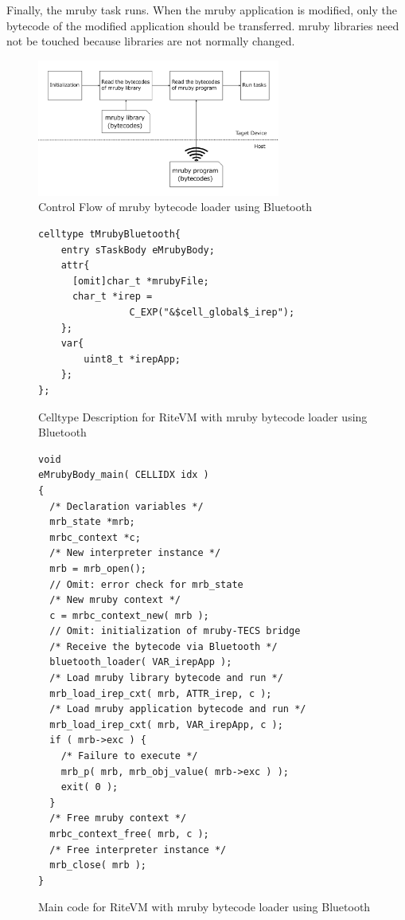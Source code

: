\documentclass[conference,compsoc]{IEEEtran}
\begin{document}
Finally, the mruby task runs.
When the mruby application is modified, only the bytecode of the modified application should be transferred.
mruby libraries need not be touched because libraries are not normally changed.
\begin{figure}[t]
    \centering
    \includegraphics[width=8cm,clip]{figure/control_flow.pdf}
    \caption{Control Flow of mruby bytecode loader using Bluetooth}
    \label{fig:control_flow}
\end{figure}
\begin{figure}[t]
\centering
\begin{lstlisting}
celltype tMrubyBluetooth{
    entry sTaskBody eMrubyBody;
    attr{
      [omit]char_t *mrubyFile;
      char_t *irep =
                C_EXP("&$cell_global$_irep");
    };
    var{
        uint8_t *irepApp;
    };
};
\end{lstlisting}
\caption{Celltype Description for RiteVM with mruby bytecode loader using Bluetooth}
\label{celltype_mrubybluetooth}
\end{figure}
\begin{figure}[t]
\centering
\begin{lstlisting}
void
eMrubyBody_main( CELLIDX idx )
{
  /* Declaration variables */
  mrb_state *mrb;
  mrbc_context *c;
  /* New interpreter instance */
  mrb = mrb_open();
  // Omit: error check for mrb_state
  /* New mruby context */
  c = mrbc_context_new( mrb );
  // Omit: initialization of mruby-TECS bridge
  /* Receive the bytecode via Bluetooth */
  bluetooth_loader( VAR_irepApp );
  /* Load mruby library bytecode and run */
  mrb_load_irep_cxt( mrb, ATTR_irep, c );
  /* Load mruby application bytecode and run */
  mrb_load_irep_cxt( mrb, VAR_irepApp, c );
  if ( mrb->exc ) {
    /* Failure to execute */
    mrb_p( mrb, mrb_obj_value( mrb->exc ) );
    exit( 0 );
  }
  /* Free mruby context */
  mrbc_context_free( mrb, c );
  /* Free interpreter instance */
  mrb_close( mrb );
}

\end{lstlisting}
\caption{Main code for RiteVM with mruby bytecode loader using Bluetooth}
\label{maincode_mrubybluetooth}
\end{figure}
\end{document}
